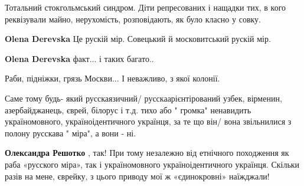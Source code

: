 \begin{itemize}
Тотальний стокгольмський синдром. Діти репресованих і нащадки тих, в кого
реквізували майно, нерухомість, розповідають, як було класно у совку.

\begin{itemize}
 
\textbf{Olena Derevska}
Це рускій мір.
Совецький й московитський рускій мір.

 
\textbf{Olena Derevska} факт... і таких багато..

\end{itemize}

 
Раби, підніжки, грязь Москви... І неважливо, з якої колонії.

 

Саме тому будь- який русскаязичний/ русскаарієнтірований узбек, вірменин,
азербайджанець, єврей, білорус і т.д. тихо або " громка" ненавидить
україномовного, україноідентичного українця, за те що він/ вона звільнилися з
полону русскава " міра", а вони - ні.

\begin{itemize}
 
\textbf{Олександра Решотко} , так! При тому незалежно від етнічного походження як раба «русского міра», так і україномовного україноідентичного українця. Скільки разів на мене, єврейку, з цього приводу мої ж «єдинокровні» наїжджали!
\end{itemize}


\end{itemize}
